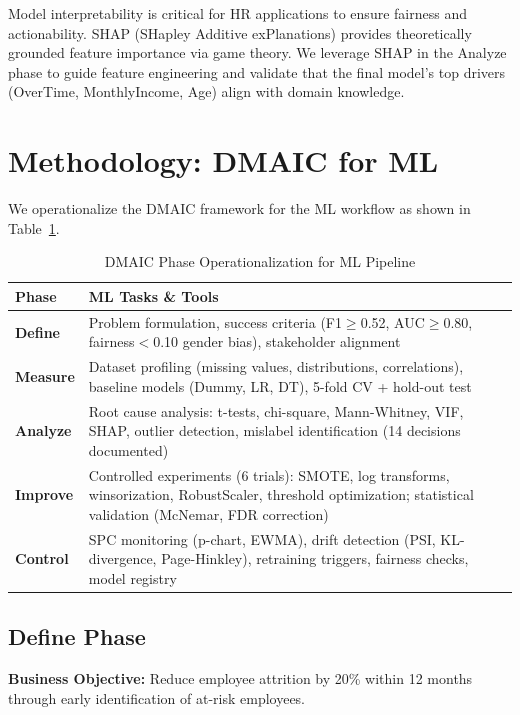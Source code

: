 \documentclass[conference]{IEEEtran}
\begin{document}
Model interpretability is critical for HR applications to ensure fairness and actionability. SHAP (SHapley Additive exPlanations) \cite{lundberg2017unified} provides theoretically grounded feature importance via game theory. We leverage SHAP in the Analyze phase to guide feature engineering and validate that the final model's top drivers (OverTime, MonthlyIncome, Age) align with domain knowledge.

\section{Methodology: DMAIC for ML}

We operationalize the DMAIC framework for the ML workflow as shown in Table~\ref{tab:dmaic_mapping}.

\begin{table}[!t]
\caption{DMAIC Phase Operationalization for ML Pipeline}
\label{tab:dmaic_mapping}
\centering
\small
\begin{tabular}{lp{5.5cm}}
\toprule
\textbf{Phase} & \textbf{ML Tasks \& Tools} \\
\midrule
\textbf{Define} & Problem formulation, success criteria (F1$\geq$0.52, AUC$\geq$0.80, fairness$<$0.10 gender bias), stakeholder alignment \\
\midrule
\textbf{Measure} & Dataset profiling (missing values, distributions, correlations), baseline models (Dummy, LR, DT), 5-fold CV + hold-out test \\
\midrule
\textbf{Analyze} & Root cause analysis: t-tests, chi-square, Mann-Whitney, VIF, SHAP, outlier detection, mislabel identification (14 decisions documented) \\
\midrule
\textbf{Improve} & Controlled experiments (6 trials): SMOTE, log transforms, winsorization, RobustScaler, threshold optimization; statistical validation (McNemar, FDR correction) \\
\midrule
\textbf{Control} & SPC monitoring (p-chart, EWMA), drift detection (PSI, KL-divergence, Page-Hinkley), retraining triggers, fairness checks, model registry \\
\bottomrule
\end{tabular}
\end{table}

\subsection{Define Phase}

\textbf{Business Objective:} Reduce employee attrition by 20\% within 12 months through early identification of at-risk employees.
\end{document}
